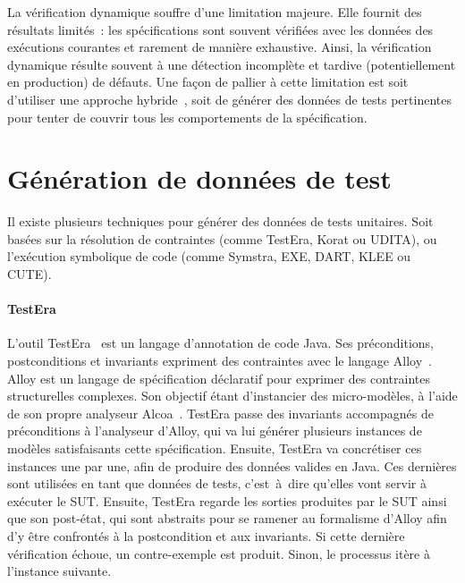
La vérification dynamique souffre d'une limitation majeure. Elle fournit des
résultats limités~: les spécifications sont souvent vérifiées avec les données
des exécutions courantes et rarement de manière exhaustive. Ainsi, la
vérification dynamique résulte souvent à une détection incomplète et tardive
(potentiellement en production) de défauts. Une façon de pallier à cette
limitation est soit d'utiliser une approche hybride~, soit de
générer des données de tests pertinentes pour tenter de couvrir tous les
comportements de la spécification.

\section{Génération de données de test}

Il existe plusieurs techniques pour générer des données de tests unitaires. Soit
basées sur la résolution de contraintes (comme TestEra, Korat ou UDITA), ou
l'exécution symbolique de code (comme Symstra, EXE, DART, KLEE ou CUTE).

\paragraph{TestEra} L'outil TestEra~ est un langage
d'annotation de code Java. Ses préconditions, postconditions et invariants
expriment des contraintes avec le langage Alloy~. Alloy est un
langage de spécification déclaratif pour exprimer des contraintes structurelles
complexes. Son objectif étant d'instancier des micro-modèles, à l'aide de son
propre analyseur Alcoa~. TestEra passe des invariants
accompagnés de préconditions à l'analyseur d'Alloy, qui va lui générer plusieurs
instances de modèles satisfaisants cette spécification. Ensuite, TestEra va
concrétiser ces instances une par une, afin de produire des données valides en
Java. Ces dernières sont utilisées en tant que données de tests, c'est~à~dire
qu'elles vont servir à exécuter le SUT. Ensuite, TestEra regarde les sorties
produites par le SUT ainsi que son post-état, qui sont abstraits pour se ramener
au formalisme d'Alloy afin d'y être confrontés à la postcondition et aux
invariants. Si cette dernière vérification échoue, un contre-exemple est
produit. Sinon, le processus itère à l'instance suivante.

